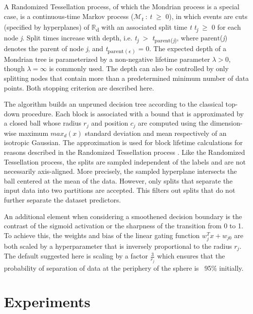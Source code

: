 \documentclass[a4paper,11pt,final]{article}
\begin{document}
A Randomized Tessellation process, of which the Mondrian process is a special case, is a continuous-time Markov process ($\mathcal{M}$\textsubscript{\textit{t}} : \textit{t} $\geq$ 0), in which events are cuts (specified by hyperplanes) of $\mathbb{R}$\textsubscript{d} with an associated split time \textit{t} \textit{t}\textsubscript{\textit{j}} $\geq$ 0 for each node \textit{j}. Split times increase with depth, i.e. \textit{t}\textsubscript{\textit{j}} $>$
\textit{t}\textsubscript{$\mathrm{parent}$(\textit{j})}, where $\mathrm{parent}$(\textit{j}) denotes the parent of node \textit{j}, and \textit{t}\textsubscript{$\mathrm{parent}(\epsilon)$} = 0. The expected depth of a Mondrian tree is parameterized by a non-negative lifetime parameter $\lambda > 0$, though $\lambda = \infty$ is commonly used. The depth can also be controlled by only splitting nodes that contain more than a predetermined minimum number of data points. Both stopping criterion are described here.

The algorithm builds an unpruned decision tree according to the classical top-down procedure. Each block is associated with a bound that is approximated by a closed ball whose radius $r_j$ and position $c_j$ are computed using the dimension-wise maximum $max_d(x)$ standard deviation and mean respectively of an isotropic Gaussian. The approximation is used for block lifetime calculations for reasons described in the Randomized Tessellation process \cite{2019arXiv190605440G}. Like the Randomized Tessellation process, the splits are sampled independent of the labels and are not necessarily axis-aligned. More precisely, the sampled hyperplane intersects the ball centered at the mean of the data. However, only splits that separate the input data into two partitions are accepted. This filters out splits that do not further separate the dataset predictors.

An additional element when considering a smoothened decision boundary is the contrast of the sigmoid activation or the sharpness of the transition from 0 to 1. To achieve this, the weights and bias of the linear gating function $w^T_jx + w_{j0}$ are both scaled by a hyperparameter that is inversely proportional to the radius $r_j$. The default suggested here is scaling by a factor $\frac{3}{r_j}$ which ensures that the probability of separation of data at the periphery of the sphere is ~95\% initially.

\section{Experiments}
\end{document}
